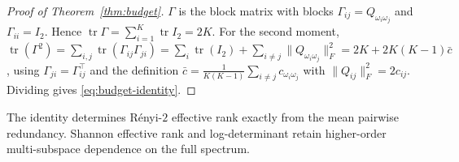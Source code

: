 \begin{proof}[Proof of Theorem~\ref{thm:budget}]
$\Gamma$ is the block matrix with blocks $\Gamma_{ij}=Q_{\omega_i\omega_j}$ and
$\Gamma_{ii}=I_2$. Hence $\operatorname{tr}\Gamma=\sum_{i=1}^K\operatorname{tr}I_2=2K$.
For the second moment,
$\operatorname{tr}(\Gamma^2)=\sum_{i,j}\operatorname{tr}(\Gamma_{ij}\Gamma_{ji})
=\sum_i\operatorname{tr}(I_2)+\sum_{i\neq j}\|Q_{\omega_i\omega_j}\|_F^2
=2K+2K(K-1)\bar c$, using $\Gamma_{ji}=\Gamma_{ij}^\top$ and the definition
$\bar c=\frac{1}{K(K-1)}\sum_{i\neq j}c_{\omega_i\omega_j}$ with
$\|Q_{ij}\|_F^2=2c_{ij}$. Dividing gives \eqref{eq:budget-identity}.
\end{proof}

The identity determines R\'enyi-$2$ effective rank exactly from the mean pairwise
redundancy. Shannon effective rank and log-determinant retain higher-order
multi-subspace dependence on the full spectrum.

